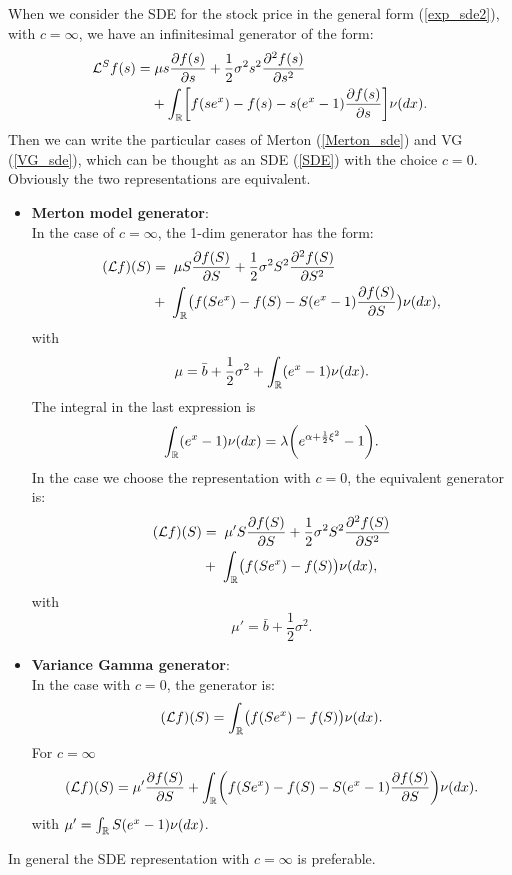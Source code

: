 When we consider the SDE for the stock price in the general form (\ref{exp_sde2}), with $c=\infty$, we have an infinitesimal generator of the form:
\begin{align}\label{inf_gen_exp_levy}
 \mathcal{L}^S f(s) =& \; \mu s \frac{\partial f(s)}{\partial s}
+ \frac{1}{2} \sigma^2 s^2 \frac{\partial^2  f(s)}{\partial s^2}  \\ \nonumber
&+ \int_{\mathbb{R}} \biggl[ f(se^x) - f(s) - s(e^x-1)\frac{\partial f(s)}{\partial s} \biggr] \nu(dx).
\end{align}
Then we can write the particular
cases of Merton (\ref{Merton_sde}) and VG (\ref{VG_sde}), which can be thought as an SDE (\ref{SDE}) with the choice $c=0$. \\
Obviously the two representations are equivalent.
\begin{itemize}
 \item \textbf{Merton model generator}:\\
 In the case of $c=\infty$, the 1-dim generator has the form:  
 \begin{align}\label{Merton_gen}
  (\mathcal{L} f)(S)  &= \;  \mu S \frac{\partial f(S)}{\partial S} + \frac{1}{2} \sigma^2 S^2 \frac{\partial^2 f(S)}{\partial S^2} \\ \nonumber
  &+ \; \int_{\mathbb{R}} \bigl( f(Se^x) - f(S) - S(e^x-1)\frac{\partial f(S)}{\partial S} \bigr) \nu(dx), 
 \end{align}
with $$ \mu = \bar b + \frac{1}{2}\sigma^2 + \int_{\mathbb{R}} ( e^{x} - 1 ) \nu(dx). $$
The integral in the last expression is 
\begin{align*}
 \int_{\mathbb{R}} ( e^{x} - 1 ) \nu(dx) = \lambda \biggl( e^{\alpha + \frac{1}{2} \xi^2} -1 \biggr).
\end{align*}
In the case we choose the representation with $c=0$, the equivalent generator is:
 \begin{align}\label{Merton_gen}
  (\mathcal{L} f)(S)  &= \;  \mu'S \frac{\partial f(S)}{\partial S} + \frac{1}{2} \sigma^2 S^2 \frac{\partial^2 f(S)}{\partial S^2} \\ \nonumber
  &+ \; \int_{\mathbb{R}} \bigl( f(Se^x) - f(S) \bigr) \nu(dx), 
 \end{align}
with $$ \mu' = \bar b + \frac{1}{2}\sigma^2. $$
 \item \textbf{Variance Gamma generator}:\\
 In the case with $c = 0$, the generator is:
 \begin{equation}\label{VG_gen}
  (\mathcal{L} f)(S) = \int_{\mathbb{R}} \bigl( f(Se^x) - f(S) \bigr) \nu(dx).
 \end{equation}
 \newline
 For $c = \infty$ 
 \begin{equation*}
  (\mathcal{L} f)(S) = \mu' \frac{\partial f(S)}{\partial S} 
  + \int_{\mathbb{R}} \biggl( f(Se^x) - f(S) - S(e^x-1)\frac{\partial f(S)}{\partial S} \biggr) \nu(dx).
 \end{equation*}
 with $\mu' = \int_{\mathbb{R}} S(e^x-1)\nu(dx)$.
\end{itemize}
In general the SDE representation with $c = \infty$ is preferable. 

